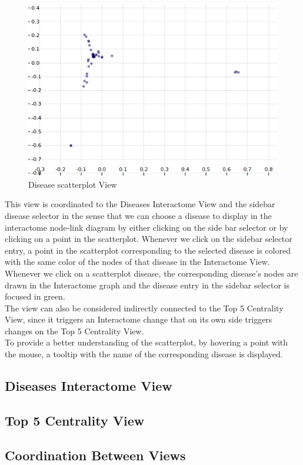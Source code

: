 \documentclass[12pt,twocolumn,twoside]{article}
\begin{document}
	\begin{figure}
		\includegraphics[width=.95\linewidth]{disease-scatterplot-mds.png}
		\caption{Disease scatterplot View}
		\label{scatter}
	\end{figure}
This view is coordinated to the Diseases Interactome View and the sidebar disease selector in the sense that we can choose a disease to display in the interactome node-link diagram by either clicking on the side bar selector or by clicking on a point in the scatterplot. Whenever we click on the sidebar selector entry, a point in the scatterplot corresponding to the selected disease is colored with the same color of the nodes of that disease in the Interactome View. Whenever we click on a scatterplot disease, the corresponding disease's nodes are drawn in the Interactome graph and the disease entry in the sidebar selector is focused in green.\\ The view can also be considered indirectly connected to the Top 5 Centrality View, since it triggers an Interactome change that on its own side triggers changes on the Top 5 Centrality View. \\To provide a better understanding of the scatterplot, by hovering a point with the mouse, a tooltip with the name of the corresponding disease is displayed. 
\subsection*{Diseases Interactome View}
\subsection*{Top 5 Centrality View}
\subsection*{Coordination Between Views}




\clearpage

 
\end{document}
